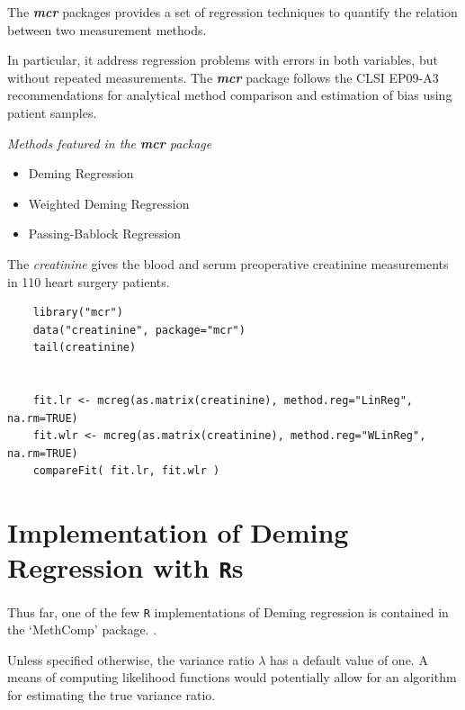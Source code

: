 \documentclass[12pt, a4paper]{report}
\theoremstyle{plain}
\theoremstyle{definition}
\theoremstyle{remark}
\begin{document}
The \textbf{\textit{mcr}} packages provides a set of regression techniques to quantify the relation between two measurement methods.

In particular, it address regression problems with errors in both variables, but without repeated measurements.
The \textbf{\textit{mcr}} package follows the CLSI EP09-A3 recommendations for analytical
method comparison and estimation of bias using patient samples.


\textit{Methods featured in the \textbf{mcr} package}

\begin{itemize}
	\item Deming Regression
	\item Weighted Deming Regression
	\item Passing-Bablock Regression
\end{itemize}

The \textit{creatinine} gives the blood and serum preoperative creatinine measurements in 110 heart surgery patients.

\begin{framed}
	\begin{verbatim}
	library("mcr")
	data("creatinine", package="mcr")
	tail(creatinine)
	
	
	fit.lr <- mcreg(as.matrix(creatinine), method.reg="LinReg", na.rm=TRUE)
	fit.wlr <- mcreg(as.matrix(creatinine), method.reg="WLinReg", na.rm=TRUE)
	compareFit( fit.lr, fit.wlr )
	\end{verbatim}
\end{framed}


\section{Implementation of Deming Regression with \texttt{R}s}
Thus far, one of the few \texttt{R} implementations of Deming regression is contained in the `MethComp' package. \citep{BXC2008}.

Unless specified otherwise, the variance ratio $\lambda$ has a default value of one. A means of computing likelihood functions would potentially allow for an algorithm for estimating the true variance ratio.




\end{document}
